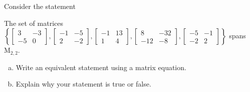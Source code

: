 
\begin{exerciseStatement}


Consider the statement 
\begin{center}\begin{minipage}{0.8\textwidth}
 The set of matrices \( \left\{ \left[\begin{array}{cc}
3 & -3 \\
-5 & 0
\end{array}\right] , \left[\begin{array}{cc}
-1 & -5 \\
2 & -2
\end{array}\right] , \left[\begin{array}{cc}
-1 & 13 \\
1 & 4
\end{array}\right] , \left[\begin{array}{cc}
8 & -32 \\
-12 & -8
\end{array}\right] , \left[\begin{array}{cc}
-5 & -1 \\
-2 & 2
\end{array}\right] \right\} \) spans \(\mathrm{M}_{2,2}\). 
\end{minipage}\end{center}
    


\begin{enumerate}[(a)]
\item  Write an equivalent statement using a matrix equation.
\item  Explain why your statement is true or false.
\end{enumerate}
    
\end{exerciseStatement}
    
